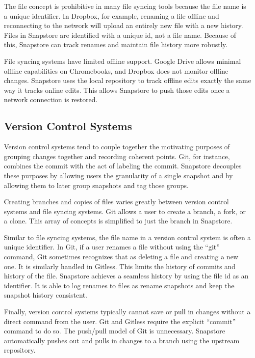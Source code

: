The file concept is prohibitive in many file syncing tools because the file name is a unique identifier. In Dropbox, for example, renaming a file offline and reconnecting to the network will upload an entirely new file with a new history. Files in Snapstore are identified with a unique id, not a file name. Because of this, Snapstore can track renames and maintain file history more robustly.

File syncing systems have limited offline support. Google Drive allows minimal offline capabilities on Chromebooks, and Dropbox does not monitor offline changes. Snapstore uses the local repository to track offline edits exactly the same way it tracks online edits. This allows Snapstore to push those edits once a network connection is restored.

\subsection{Version Control Systems}

Version control systems tend to couple together the motivating purposes of grouping changes together and recording coherent points. Git, for instance, combines the commit with the act of labeling the commit. Snapstore decouples these purposes by allowing users the granularity of a single snapshot and by allowing them to later group snapshots and tag those groups.

Creating branches and copies of files varies greatly between version control systems and file syncing systems. Git allows a user to create a branch, a fork, or a clone. This array of concepts is simplified to just the branch in Snapstore. 

Similar to file syncing systems, the file name in a version control system is often a unique identifier. In Git, if a user renames a file without using the ``git'' command, Git sometimes recognizes that as deleting a file and creating a new one. It is similarly handled in Gitless. This limits the history of commits and history of the file. Snapstore achieves a seamless history by using the file id as an identifier. It is able to log renames to files as rename snapshots and keep the snapshot history consistent.

Finally, version control systems typically cannot save or pull in changes without a direct command from the user. Git and Gitless require the explicit ``commit'' command to do so. The push/pull model of Git is unnecessary. Snapstore automatically pushes out and pulls in changes to a branch using the upstream repository.




